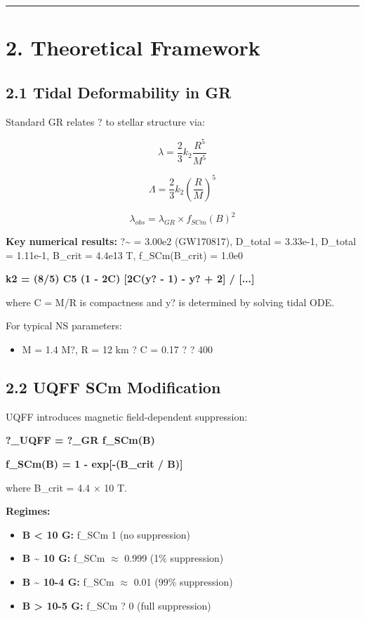 \documentclass[11pt]{article}
\begin{document}
\noindent\rule{\textwidth}{0.4pt}

\section*{2. Theoretical Framework}

\subsection*{2.1 Tidal Deformability in GR}

Standard GR relates ? to stellar structure via:

$$\lambda = \frac{2}{3} k_2 \frac{R^5}{M^5}$$

$$\Lambda = \frac{2}{3} k_2 \left(\frac{R}{M}\right)^5$$

$$\lambda_{obs} = \lambda_{GR} \times f_{SCm}(B)^2$$

\textbf{Key numerical results:} ?\textasciitilde{} = 3.00e2 (GW170817), D\_total = 3.33e-1, D\_total = 1.11e-1, B\_crit = 4.4e13 T, f\_SCm(B\_crit) = 1.0e0

\textbf{k2 = (8/5) C5 (1 - 2C) [2C(y? - 1) - y? + 2] / [...]}

where C = M/R is compactness and y? is determined by solving tidal ODE.

For typical NS parameters:

\begin{itemize}
  \item M = 1.4 M?, R = 12 km ? C = 0.17 ? ?  400
\end{itemize}

\subsection*{2.2 UQFF SCm Modification}

UQFF introduces magnetic field-dependent suppression:

\textbf{?\_UQFF = ?\_GR  f\_SCm(B)}

\textbf{f\_SCm(B) = 1 - exp[-(B\_crit / B)]}

where B\_crit = 4.4 $\times$ 10 T.

\textbf{Regimes:}

\begin{itemize}
  \item \textbf{B < 10 G:} f\_SCm  1 (no suppression)
  \item \textbf{B \textasciitilde{} 10 G:} f\_SCm $\approx$ 0.999 (1\% suppression)
  \item \textbf{B \textasciitilde{} 10-4 G:} f\_SCm $\approx$ 0.01 (99\% suppression)
  \item \textbf{B > 10-5 G:} f\_SCm ? 0 (full suppression)
\end{itemize}
\end{document}
